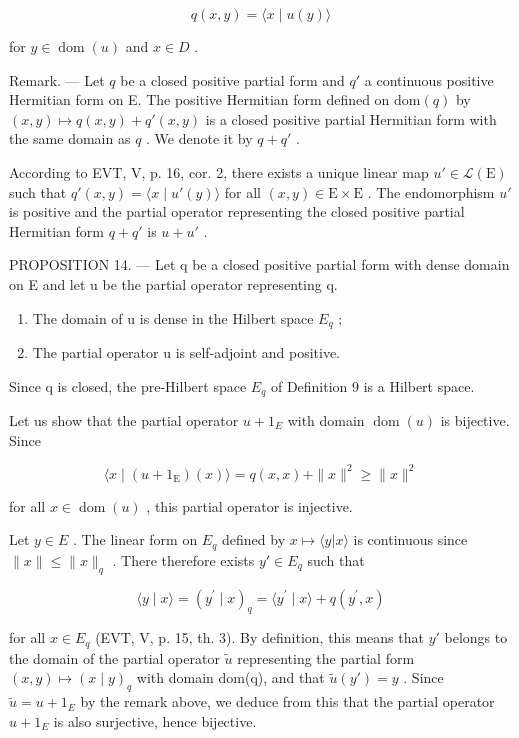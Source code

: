 \[
q (x, y) = \langle x \mid u (y) \rangle
\]

for \(y \in \operatorname{dom}(u)\) and \(x \in D\) .

Remark. --- Let \(q\) be a closed positive partial form and \(q'\) a continuous positive Hermitian form on E. The positive Hermitian form defined on \(\text{dom}(q)\) by \((x, y) \mapsto q(x, y) + q'(x, y)\) is a closed positive partial Hermitian form with the same domain as \(q\) . We denote it by \(q + q'\) .

According to EVT, V, p. 16, cor. 2, there exists a unique linear map \(u' \in \mathcal{L}(\mathrm{E})\) such that \(q'(x,y) = \langle x \mid u'(y) \rangle\) for all \((x,y) \in \mathrm{E} \times \mathrm{E}\) . The endomorphism \(u'\) is positive and the partial operator representing the closed positive partial Hermitian form \(q + q'\) is \(u + u'\) .

PROPOSITION 14. --- Let q be a closed positive partial form with dense domain on E and let u be the partial operator representing q.

\begin{enumerate}
\def\labelenumi{\alph{enumi})}
\item
  The domain of u is dense in the Hilbert space \(E_{q}\) ;
\item
  The partial operator u is self-adjoint and positive.
\end{enumerate}

Since q is closed, the pre-Hilbert space \(E_{q}\) of Definition 9 is a Hilbert space.

Let us show that the partial operator \(u + 1_{E}\) with domain \(\operatorname{dom}(u)\) is bijective. Since

\[
\langle x \mid (u + 1 _ {\mathrm{E}}) (x) \rangle = q (x, x) + \| x \| ^ {2} \geqslant \| x \| ^ {2}
\]

for all \(x \in \operatorname{dom}(u)\) , this partial operator is injective.

Let \(y \in E\) . The linear form on \(E_{q}\) defined by \(x \mapsto \langle y | x \rangle\) is continuous since \(\|x\| \leqslant \|x\|_{q}\) . There therefore exists \(y' \in E_{q}\) such that

\[
\langle y \mid x \rangle = (y ^ {\prime} \mid x) _ {q} = \langle y ^ {\prime} \mid x \rangle + q (y ^ {\prime}, x)
\]

for all \(x \in E_{q}\) (EVT, V, p. 15, th. 3). By definition, this means that \(y'\) belongs to the domain of the partial operator \(\widetilde{u}\) representing the partial form \((x, y) \mapsto (x \mid y)_{q}\) with domain dom(q), and that \(\widetilde{u}(y') = y\) . Since \(\widetilde{u} = u + 1_{E}\) by the remark above, we deduce from this that the partial operator \(u + 1_{E}\) is also surjective, hence bijective.

